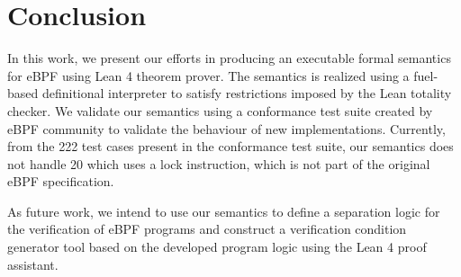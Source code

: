 \documentclass[sigconf]{acmart}
\begin{document}
\section{Conclusion}\label{sec:conclusion} %

In this work, we present our efforts in producing an executable formal 
semantics for eBPF using Lean 4 theorem prover. The semantics is realized
using a fuel-based definitional interpreter to satisfy restrictions
imposed by the Lean totality checker. We validate our semantics using a 
conformance test suite created by eBPF community to validate the behaviour 
of new implementations. Currently, from the 222 test cases present in the 
conformance test suite, our semantics does not handle 20 which uses a 
lock instruction, which is not part of the original eBPF specification.

As future work, we intend to use our semantics to define a separation logic
for the verification of eBPF programs and construct a verification 
condition generator tool based on the developed program logic using the 
Lean 4 proof assistant.




\end{document}
